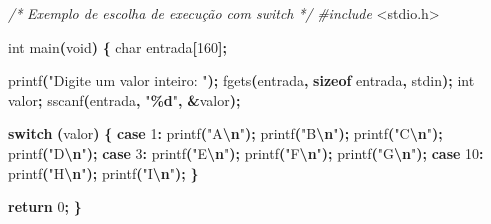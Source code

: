 \documentclass[
  11pt,
  a4paper,
]{scrbook}
\newenvironment{Shaded}{\begin{snugshade}}{\end{snugshade}}
\newcommand{\CommentTok}[1]{\textcolor[rgb]{0.56,0.35,0.01}{\textit{#1}}}
\newcommand{\ControlFlowTok}[1]{\textcolor[rgb]{0.13,0.29,0.53}{\textbf{#1}}}
\newcommand{\DataTypeTok}[1]{\textcolor[rgb]{0.13,0.29,0.53}{#1}}
\newcommand{\DecValTok}[1]{\textcolor[rgb]{0.00,0.00,0.81}{#1}}
\newcommand{\ImportTok}[1]{#1}
\newcommand{\KeywordTok}[1]{\textcolor[rgb]{0.13,0.29,0.53}{\textbf{#1}}}
\newcommand{\NormalTok}[1]{#1}
\newcommand{\OperatorTok}[1]{\textcolor[rgb]{0.81,0.36,0.00}{\textbf{#1}}}
\newcommand{\PreprocessorTok}[1]{\textcolor[rgb]{0.56,0.35,0.01}{\textit{#1}}}
\newcommand{\SpecialCharTok}[1]{\textcolor[rgb]{0.81,0.36,0.00}{\textbf{#1}}}
\newcommand{\StringTok}[1]{\textcolor[rgb]{0.31,0.60,0.02}{#1}}
\begin{document}
\begin{Shaded}
\begin{Highlighting}[]
\CommentTok{/*}
\CommentTok{Exemplo de escolha de execução com switch}
\CommentTok{*/}
\PreprocessorTok{\#include }\ImportTok{\textless{}stdio.h\textgreater{}}

\DataTypeTok{int}\NormalTok{ main}\OperatorTok{(}\DataTypeTok{void}\OperatorTok{)} \OperatorTok{\{}
    \DataTypeTok{char}\NormalTok{ entrada}\OperatorTok{[}\DecValTok{160}\OperatorTok{];}

\NormalTok{    printf}\OperatorTok{(}\StringTok{"Digite um valor inteiro: "}\OperatorTok{);}
\NormalTok{    fgets}\OperatorTok{(}\NormalTok{entrada}\OperatorTok{,} \KeywordTok{sizeof}\NormalTok{ entrada}\OperatorTok{,}\NormalTok{ stdin}\OperatorTok{);}
    \DataTypeTok{int}\NormalTok{ valor}\OperatorTok{;}
\NormalTok{    sscanf}\OperatorTok{(}\NormalTok{entrada}\OperatorTok{,} \StringTok{"}\SpecialCharTok{\%d}\StringTok{"}\OperatorTok{,} \OperatorTok{\&}\NormalTok{valor}\OperatorTok{);}

    \ControlFlowTok{switch} \OperatorTok{(}\NormalTok{valor}\OperatorTok{)} \OperatorTok{\{}
        \ControlFlowTok{case} \DecValTok{1}\OperatorTok{:}
\NormalTok{            printf}\OperatorTok{(}\StringTok{"A}\SpecialCharTok{\textbackslash{}n}\StringTok{"}\OperatorTok{);}
\NormalTok{            printf}\OperatorTok{(}\StringTok{"B}\SpecialCharTok{\textbackslash{}n}\StringTok{"}\OperatorTok{);}
\NormalTok{            printf}\OperatorTok{(}\StringTok{"C}\SpecialCharTok{\textbackslash{}n}\StringTok{"}\OperatorTok{);}
\NormalTok{            printf}\OperatorTok{(}\StringTok{"D}\SpecialCharTok{\textbackslash{}n}\StringTok{"}\OperatorTok{);}
        \ControlFlowTok{case} \DecValTok{3}\OperatorTok{:}
\NormalTok{            printf}\OperatorTok{(}\StringTok{"E}\SpecialCharTok{\textbackslash{}n}\StringTok{"}\OperatorTok{);}
\NormalTok{            printf}\OperatorTok{(}\StringTok{"F}\SpecialCharTok{\textbackslash{}n}\StringTok{"}\OperatorTok{);}
\NormalTok{            printf}\OperatorTok{(}\StringTok{"G}\SpecialCharTok{\textbackslash{}n}\StringTok{"}\OperatorTok{);}
        \ControlFlowTok{case} \DecValTok{10}\OperatorTok{:}
\NormalTok{            printf}\OperatorTok{(}\StringTok{"H}\SpecialCharTok{\textbackslash{}n}\StringTok{"}\OperatorTok{);}
\NormalTok{            printf}\OperatorTok{(}\StringTok{"I}\SpecialCharTok{\textbackslash{}n}\StringTok{"}\OperatorTok{);}
    \OperatorTok{\}}

    \ControlFlowTok{return} \DecValTok{0}\OperatorTok{;}
\OperatorTok{\}}
\end{Highlighting}
\end{Shaded}
\end{document}
